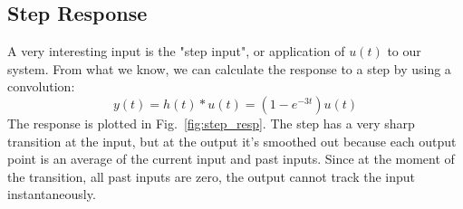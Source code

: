 \subsection{Step Response}
A very interesting input is the "step input", or application of $u(t)$ to our system.  From what we know, we can calculate the response to a step by using a convolution:
    \begin{equation}
        y(t) = h(t) * u(t) = \left( 1 - e^{-3 t} \right) u(t) 
    \end{equation}
The response is plotted in Fig.~\ref{fig:step_resp}. The step has a very sharp transition at the input, but at the output it's smoothed out because each output point is an average of the current input and past inputs.  Since at the moment of the transition, all past inputs are zero, the output cannot track the input instantaneously.  
